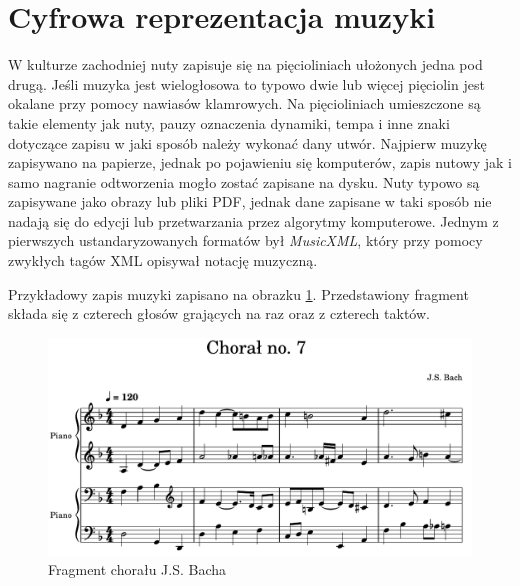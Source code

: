 \documentclass[data-science]{agh-wi} %
\begin{document}
\section{Cyfrowa reprezentacja muzyki}\label{sec:muzyka_cyfrowa}
W kulturze zachodniej nuty zapisuje się na pięcioliniach ułożonych jedna pod drugą. Jeśli muzyka jest wielogłosowa to typowo dwie lub więcej pięciolin jest okalane przy pomocy nawiasów klamrowych. Na pięcioliniach umieszczone są takie elementy jak nuty, pauzy oznaczenia dynamiki, tempa i inne znaki dotyczące zapisu w jaki sposób należy wykonać dany utwór. Najpierw muzykę zapisywano na papierze, jednak po pojawieniu się komputerów, zapis nutowy jak i samo nagranie odtworzenia mogło zostać zapisane na dysku. Nuty typowo są zapisywane jako obrazy lub pliki PDF, jednak dane zapisane w taki sposób nie nadają się do edycji lub przetwarzania przez algorytmy komputerowe. Jednym z pierwszych ustandaryzowanych formatów był \textit{MusicXML}, który przy pomocy zwykłych tagów XML opisywał notację muzyczną.

Przykładowy zapis muzyki zapisano na obrazku \ref*{fig:jsb_sheet}. Przedstawiony fragment składa się z czterech głosów grających na raz oraz z czterech taktów.

\begin{figure}
    \begin{center}
        \includegraphics[width=0.9\linewidth]{./img/jsb_7_sheet.pdf}
    \end{center}
    \caption{Fragment chorału J.S. Bacha}\label{fig:jsb_sheet}
\end{figure}
\end{document}
